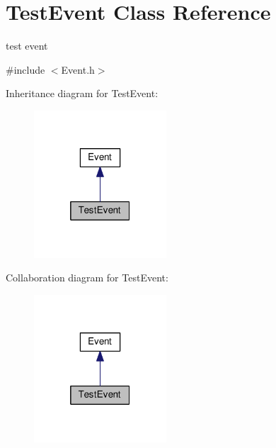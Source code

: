 \hypertarget{classTestEvent}{}\section{Test\+Event Class Reference}
\label{classTestEvent}


test event  




{\ttfamily \#include $<$Event.\+h$>$}



Inheritance diagram for Test\+Event\+:
\nopagebreak
\begin{figure}[H]
\begin{center}
\leavevmode
\includegraphics[width=140pt]{classTestEvent__inherit__graph}
\end{center}
\end{figure}


Collaboration diagram for Test\+Event\+:
\nopagebreak
\begin{figure}[H]
\begin{center}
\leavevmode
\includegraphics[width=140pt]{classTestEvent__coll__graph}
\end{center}
\end{figure}
